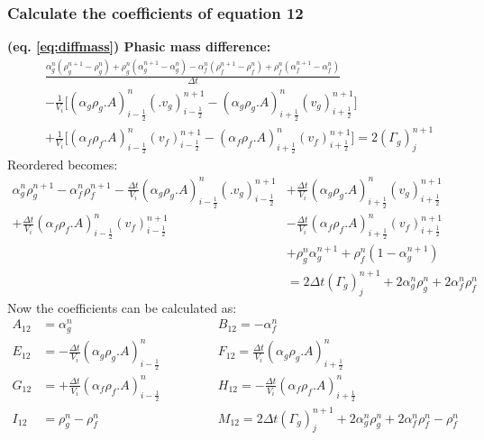 \documentclass[11pt,letterpaper,titlepage]{article}
\newcommand{\half}{\frac{1}{2}}
\begin{document}
\newpage
\subsubsection{Calculate the coefficients of equation 12}
\textbf{(eq. \ref{eq:diffmass}) Phasic mass difference:}
\begin{equation*}
\begin{aligned}
&\frac{\alpha_g^n (\rho_g^{n+1}-\rho_g^n)+\rho_g^n(\alpha_g^{n+1}-\alpha_g^n)-\alpha_f^n (\rho_f^{n+1}-\rho_f^n)+\rho_f^n(\alpha_f^{n+1}-\alpha_f^n)}{\Delta t}\\
&-\frac{1}{V_i}\biggr[(\alpha_g\rho_g.A)_{i-\half}^{n} (.v_g)_{i-\half}^{n+1}
-(\alpha_g\rho_g.A)_{i+\half}^{n} (v_g)_{i+\half}^{n+1} \biggr]\\
&+ \frac{1}{V_i}\biggr[(\alpha_f\rho_f.A)_{i-\half}^{n} (v_f)_{i-\half}^{n+1}
-(\alpha_f\rho_f.A)_{i+\half}^{n} (v_f)_{i+\half}^{n+1} \biggr]
=2(\Gamma_g)_j^{n+1}
\end{aligned}
\end{equation*}
\newline
Reordered becomes:
\begin{equation*}
\begin{aligned}
\alpha_g^n\rho_g^{n+1}-\alpha_f^n \rho_f^{n+1}
-\frac{\Delta t}{V_i}(\alpha_g\rho_g.A)_{i-\half}^{n} (.v_g)_{i-\half}^{n+1}
&+\frac{\Delta t}{V_i}(\alpha_g\rho_g.A)_{i+\half}^{n} (v_g)_{i+\half}^{n+1} \\
+ \frac{\Delta t}{V_i}(\alpha_f\rho_f.A)_{i-\half}^{n} (v_f)_{i-\half}^{n+1}
&-\frac{\Delta t}{V_i}(\alpha_f\rho_f.A)_{i+\half}^{n} (v_f)_{i+\half}^{n+1}\\
&+\rho_g^n\alpha_g^{n+1}+\rho_f^n(1-\alpha_g^{n+1})\\
&=2\Delta t(\Gamma_g)_j^{n+1}+2\alpha_g^n\rho_g^n +2\alpha_f^n\rho_f^n
\end{aligned}
\end{equation*}
\newline
Now the coefficients can be calculated as:
\begin{equation*}
\begin{aligned}
A_{12} &=  \alpha_g^n       &&B_{12} =  -\alpha_f^n \\
E_{12} &= -\frac{\Delta t}{V_i}(\alpha_g\rho_g.A)_{i-\half}^{n}   \quad \quad \quad
&&F_{12} = \frac{\Delta t}{V_i}(\alpha_g\rho_g.A)_{i+\half}^{n} \\
G_{12} &= +\frac{\Delta t}{V_i}(\alpha_f\rho_f.A)_{i-\half}^{n} 
&&H_{12} =-\frac{\Delta t}{V_i}(\alpha_f\rho_f.A)_{i+\half}^{n} \\
I_{12} & = \rho_g^n - \rho_f^n
&&M_{12} = 2\Delta t(\Gamma_g)_j^{n+1} +2\alpha_g^n\rho_g^n     +      2\alpha_f^n\rho_f^n - \rho_f^n
\end{aligned}
\end{equation*}
\end{document}

